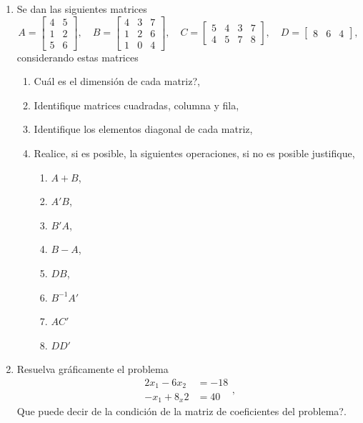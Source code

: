 \documentclass[11pt]{article}
\begin{document}
\begin{enumerate}
\item Se dan las siguientes matrices
$$
A=\begin{bmatrix}
4 & 5 \\ 1 & 2 \\ 5 & 6
\end{bmatrix},
\quad
B=\begin{bmatrix}
4 & 3 & 7 \\
1 & 2 & 6\\
1 & 0 & 4 
\end{bmatrix},
\quad
C=
\begin{bmatrix}
5 & 4 & 3 & 7 \\
4 & 5 & 7 & 8
\end{bmatrix},
\quad
D=\begin{bmatrix}
8 & 6 & 4
\end{bmatrix},
$$
considerando estas matrices
\begin{multicols}{2}
\begin{enumerate}
\item \textquestiondown Cu\'al es el  dimensi\'on de cada matriz?,
\item Identifique matrices cuadradas, columna y fila,
\item Identifique los elementos diagonal de cada matriz,
\item Realice, si es posible, la siguientes operaciones, si no es posible justifique,
\begin{multicols}{3}
\begin{enumerate}
\item $A+B$,
\item $A'B$,
\item $B'A$,
\item $B-A$,
\item $DB$,
\item $B^{-1}A'$
\item $AC'$
\item $DD'$
\end{enumerate}
\end{multicols}
\end{enumerate}
\end{multicols}

\item Resuelva gr\'aficamente el problema
$$
\begin{array}{lr}
2x_1-6x_2	&=-18 \\
-x_1+8_x2	&= 40 
\end{array},
$$
\textquestiondown Que puede decir de la condici\'on de la matriz de coeficientes del problema?.


\end{enumerate}
\end{document}
